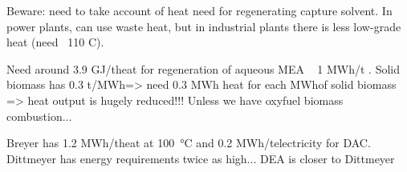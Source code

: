 Beware: need to take account of heat need for regenerating \co capture solvent.
In power plants, can use waste heat, but in industrial plants there is less
low-grade heat (need ~110 C). 

Need around 3.9 GJ/t\co heat for regeneration of aqueous MEA ~ 1 MWh/t\co
{}. Solid biomass has 0.3 t\co/MWh\th => need 0.3 MWh heat for
each MWh\th of solid biomass => heat output is hugely reduced!!! Unless we have
oxyfuel biomass combustion...

Breyer 
has 1.2 MWh/t\co heat at \SI{100}{\celsius} and 0.2 MWh\el/t\co electricity for DAC.
Dittmeyer has energy requirements twice as high... DEA is closer to Dittmeyer

